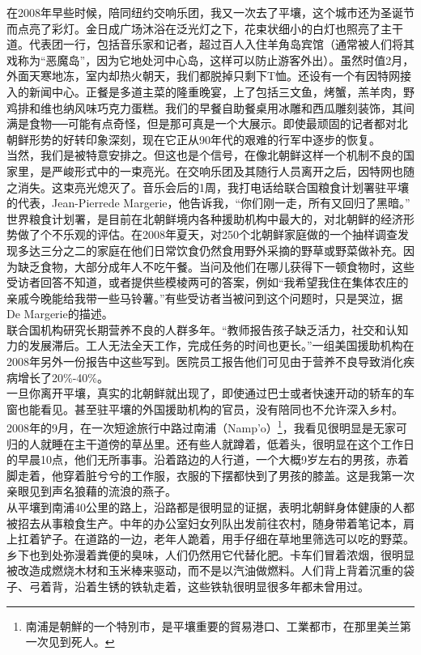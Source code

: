 在2008年早些时候，陪同纽约交响乐团，我又一次去了平壤，这个城市还为圣诞节而点亮了彩灯。金日成广场沐浴在泛光灯之下，花束状细小的白灯也照亮了主干道。代表团一行，包括音乐家和记者，超过百人入住羊角岛宾馆（通常被人们将其戏称为“恶魔岛”，因为它地处河中心岛，这样可以防止游客外出）。虽然时值2月，外面天寒地冻，室内却热火朝天，我们都脱掉只剩下T恤。还设有一个有因特网接入的新闻中心。正餐是多道主菜的隆重晚宴，上了包括三文鱼，烤蟹，羔羊肉，野鸡排和维也纳风味巧克力蛋糕。我们的早餐自助餐桌用冰雕和西瓜雕刻装饰，其间满是食物──可能有点奇怪，但是那可真是一个大展示。即使最顽固的记者都对北朝鲜形势的好转印象深刻，现在它正从90年代的艰难的行军中逐步的恢复。\\

当然，我们是被特意安排之。但这也是个信号，在像北朝鲜这样一个机制不良的国家里，是严峻形式中的一束亮光。在交响乐团及其随行人员离开之后，因特网也随之消失。这束亮光熄灭了。音乐会后的1周，我打电话给联合国粮食计划署驻平壤的代表，Jean-Pierrede Margerie，他告诉我，“你们刚一走，所有又回归了黑暗。”\\

世界粮食计划署，是目前在北朝鲜境内各种援助机构中最大的，对北朝鲜的经济形势做了个不乐观的评估。在2008年夏天，对250个北朝鲜家庭做的一个抽样调查发现多达三分之二的家庭在他们日常饮食仍然食用野外采摘的野草或野菜做补充。因为缺乏食物，大部分成年人不吃午餐。当问及他们在哪儿获得下一顿食物时，这些受访者回答不知道，或者提供些模棱两可的答案，例如“我希望我住在集体农庄的亲戚今晚能给我带一些马铃薯。”有些受访者当被问到这个问题时，只是哭泣，据De Margerie的描述。\\

联合国机构研究长期营养不良的人群多年。“教师报告孩子缺乏活力，社交和认知力的发展滞后。工人无法全天工作，完成任务的时间也更长。”一组美国援助机构在2008年另外一份报告中这些写到。医院员工报告他们可见由于营养不良导致消化疾病增长了20\%-40\%。\\

一旦你离开平壤，真实的北朝鲜就出现了，即使通过巴士或者快速开动的轿车的车窗也能看见。甚至驻平壤的外国援助机构的官员，没有陪同也不允许深入乡村。2008年的9月，在一次短途旅行中路过南浦（Namp'o）\footnote{南浦是朝鮮的一个特別市，是平壤重要的貿易港口、工業都市，在那里美兰第一次见到死人。}，我看见很明显是无家可归的人就睡在主干道傍的草丛里。还有些人就蹲着，低着头，很明显在这个工作日的早晨10点，他们无所事事。沿着路边的人行道，一个大概9岁左右的男孩，赤着脚走着，他穿着脏兮兮的工作服，衣服的下摆都快到了男孩的膝盖。这是我第一次亲眼见到声名狼藉的流浪的燕子。\\

从平壤到南浦40公里的路上，沿路都是很明显的证据，表明北朝鲜身体健康的人都被招去从事粮食生产。中年的办公室妇女列队出发前往农村，随身带着笔记本，肩上扛着铲子。在道路的一边，老年人跪着，用手仔细在草地里筛选可以吃的野菜。乡下也到处弥漫着粪便的臭味，人们仍然用它代替化肥。卡车们冒着浓烟，很明显被改造成燃烧木材和玉米棒来驱动，而不是以汽油做燃料。人们背上背着沉重的袋子、弓着背，沿着生锈的铁轨走着，这些铁轨很明显很多年都未曾用过。\\

